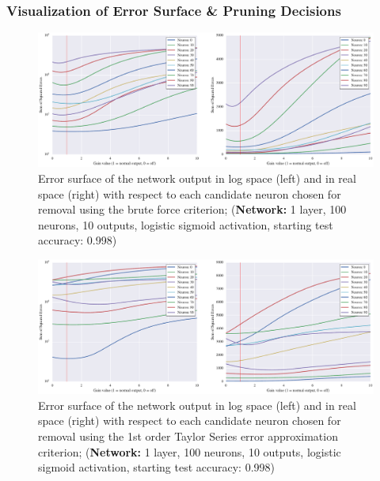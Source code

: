 
\subsubsection{Visualization of Error Surface \& Pruning Decisions}

\begin{figure}[!hb]
\centering
\includegraphics[width=\linewidth]{png/mnist-acc99-gt-gain.pdf}
\caption{Error surface of the network output in log space (left) and in real space (right) with respect to each candidate neuron chosen for removal using the brute force criterion; (\textbf{Network:} 1 layer, 100 neurons, 10 outputs, logistic sigmoid activation, starting test accuracy: 0.998)}
\label{fig:mnist-gt-single-layer}
\end{figure}

\begin{figure}[!hb]
\centering
\includegraphics[width=\linewidth]{png/mnist-acc99-g1-gain.pdf}
\caption{Error surface of the network output in log space (left) and in real space (right) with respect to each candidate neuron chosen for removal using the 1st order Taylor Series error approximation criterion; (\textbf{Network:} 1 layer, 100 neurons, 10 outputs, logistic sigmoid activation, starting test accuracy: 0.998)}
\label{fig:mnist-gt-single-layer}
\end{figure}

